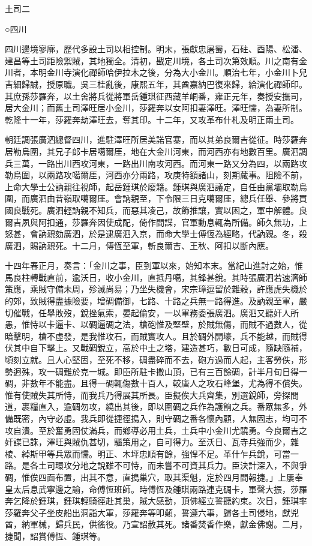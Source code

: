 
\begin{pinyinscope}
土司二

○四川

四川邊境寥廓，歷代多設土司以相控制。明末，張獻忠屠蜀，石砫、酉陽、松潘、建昌等土司距險禦賊，其地獨全。清初，戡定川境，各土司次第效順。川之南有金川者，本明金川寺演化禪師哈伊拉木之後，分為大小金川。順治七年，小金川卜兒吉細歸誠，授原職。吳三桂亂後，康熙五年，其酋嘉納巴復來歸，給演化禪師印。其庶孫莎羅奔，以土舍將兵從將軍岳鍾琪征西藏羊峒番，雍正元年，奏授安撫司，居大金川；而舊土司澤旺居小金川，莎羅奔以女阿扣妻澤旺。澤旺懦，為妻所制。乾隆十一年，莎羅奔劫澤旺去，奪其印。十二年，又攻革布什札及明正兩土司。

朝廷調張廣泗總督四川，進駐澤旺所居美諾官寨，而以其弟良爾吉從征。時莎羅奔居勒烏圍，其兄子郎卡居噶爾厓，地在大金川河東，而河西亦有地數百里。廣泗調兵三萬，一路出川西攻河東，一路出川南攻河西。而河東一路又分為四，以兩路攻勒烏圍，以兩路攻噶爾厓，河西亦分兩路，攻庚特額諸山，刻期蕆事。阻險不前，上命大學士公訥親往視師，起岳鍾琪於廢籍。鍾琪與廣泗議定，自任由黨壩取勒烏圍，而廣泗由昔嶺取噶爾厓。會訥親至，下令限三日克噶爾厓，總兵任舉、參將買國良戰死。廣泗輕訥親不知兵，而惡其凌己，故飾推讓，實以困之，軍中解體。良爾吉夙與阿扣通，莎羅奔因使成配，倚作間諜，官軍動息輒為所備。師久無功，上怒甚，會訥親劾廣泗，於是逮廣泗入京，而命大學士傅恆為經略，代訥親。冬，殺廣泗，賜訥親死。十二月，傅恆至軍，斬良爾吉、王秋、阿扣以斷內應。

十四年春正月，奏言：「金川之事，臣到軍以來，始知本末。當紀山進討之始，惟馬良柱轉戰直前，逾沃日，收小金川，直抵丹噶，其鋒甚銳。其時張廣泗若速濟師策應，乘賊守備未周，殄滅尚易；乃坐失機會，宋宗璋逗留於雜穀，許應虎失機於的郊，致賊得盡據險要，增碉備御，七路、十路之兵無一路得進。及訥親至軍，嚴切催戰，任舉敗歿，銳挫氣索，晏起偷安，一以軍務委張廣泗。廣泗又聽奸人所愚，惟恃以卡逼卡、以碉逼碉之法，槍砲惟及堅壁，於賊無傷，而賊不過數人，從暗擊明，槍不虛發，是我惟攻石，而賊實攻人。且於碉外開壕，兵不能越，而賊得伏其中自下擊上。又戰碉銳立，高於中土之塔，建造甚巧，數日可成，隨缺隨補，頃刻立就。且人心堅固，至死不移，碉盡碎而不去，砲方過而人起，主客勞佚，形勢迥殊，攻一碉難於克一城。即臣所駐卡撒山頂，已有三百餘碉，計半月旬日得一碉，非數年不能盡。且得一碉輒傷數十百人，較唐人之攻石峰堡，尤為得不償失。惟有使賊失其所恃，而我兵乃得展其所長。臣擬俟大兵齊集，別選銳師，旁探間道，裹糧直入，逾碉勿攻，繞出其後，即以圍碉之兵作為護餉之兵。番眾無多，外備既密，內守必虛。我兵即從捷徑搗入，則守碉之番各懷內顧，人無固志，均可不攻自潰。至於奮勇固仗滿兵，而鄉導必用土兵，土兵中小金川尤驍勇。今良爾吉之奸諜已誅，澤旺與賊仇甚切，驅策用之，自可得力。至沃日、瓦寺兵強而少，雜棱、綽斯甲等兵眾而懦。明正、木坪忠順有餘，強悍不足。革什乍兵銳，可當一路。是各土司環攻分地之說雖不可恃，而未嘗不可資其兵力。臣決計深入，不與爭碉，惟俟四面布置，出其不意，直搗巢穴，取其渠魁，定於四月間報捷。」上屢奉皇太后息武寧邊之諭，命傅恆班師。時傅恆及鍾琪兩路連克碉卡，軍聲大振，莎羅奔乞降於鍾琪，鍾琪輕騎徑赴其巢，賊大感動，頂佛經立誓聽約束。次日，鍾琪率莎羅奔父子坐皮船出洞詣大軍，莎羅奔等叩顙，誓遵六事，歸各土司侵地，獻兇酋，納軍械，歸兵民，供徭役。乃宣詔赦其死。諸番焚香作樂，獻金佛謝。二月，捷聞，詔賞傅恆、鍾琪等。


\end{pinyinscope}
